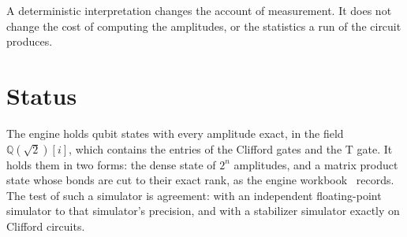 A deterministic interpretation changes the account of measurement. It does not change the cost of computing the amplitudes, or the statistics a run of the circuit produces.

\section{\texorpdfstring{Status}{Status}}

The engine holds qubit states with every amplitude exact, in the field \(\mathbb{Q}(\sqrt{2})[i]\), which contains the entries of the Clifford gates and the T gate. It holds them in two forms: the dense state of \(2^n\) amplitudes, and a matrix product state whose bonds are cut to their exact rank, as the engine workbook~\cite{src:Quigg-engine-workbook} records. The test of such a simulator is agreement: with an independent floating-point simulator to that simulator's precision, and with a stabilizer simulator exactly on Clifford circuits.
